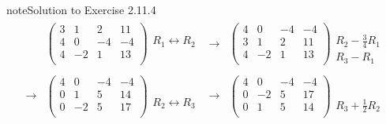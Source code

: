 \documentclass[letterpaper,10pt,english]{jupyterBook}
\begin{document}
\begin{sphinxadmonition}{note}{Solution to Exercise 2.11.4}
\begin{equation*}
\begin{split}
\begin{align*}
    & \left( \begin{array}{ccc|c} 
         3 & 1 & 2 & 11 \\ 
         4 & 0 & -4 & -4 \\ 
         4 & -2 & 1 & 13 \\ 
    \end{array} \right) 
    \begin{array}{l} \phantom{x} \\ R_{1} \leftrightarrow R_{2} \\ \\ \phantom{x} \end{array} & 
    \longrightarrow 
    & \left( \begin{array}{ccc|c} 
         4 & 0 & -4 & -4 \\ 
         3 & 1 & 2 & 11 \\ 
         4 & -2 & 1 & 13 \\ 
    \end{array} \right) 
    \begin{array}{l} \phantom{x} \\ R_{2} - \frac{3}{4} R_{1} \\ R_{3} - R_{1} \end{array} \\ \\ 
    \longrightarrow 
    & \left( \begin{array}{ccc|c} 
         4 & 0 & -4 & -4 \\ 
         0 & 1 & 5 & 14 \\ 
         0 & -2 & 5 & 17 \\ 
    \end{array} \right) 
    \begin{array}{l} \phantom{x} \\ \phantom{x} \\ R_{2} \leftrightarrow R_{3} \\ \end{array} & 
    \longrightarrow 
    & \left( \begin{array}{ccc|c} 
         4 & 0 & -4 & -4 \\ 
         0 & -2 & 5 & 17 \\ 
         0 & 1 & 5 & 14 \\ 
    \end{array} \right) 
    \begin{array}{l} \phantom{x} \\ \phantom{x} \\ R_{3} + \frac{1}{2} R_{2}\end{array} \\ \\ 

\end{align*}
\end{split}
\end{equation*}
\end{sphinxadmonition}
\end{document}
